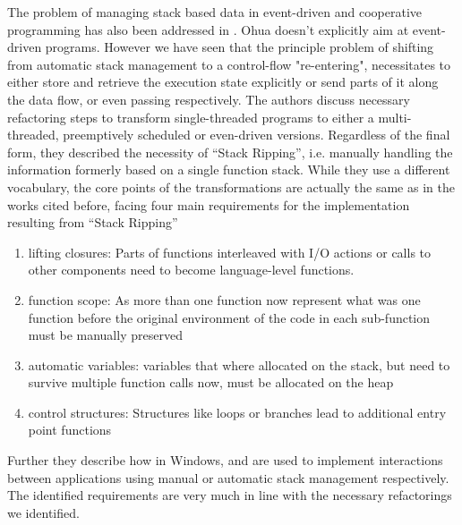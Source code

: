 The problem of managing stack based data in event-driven and cooperative programming has  also been addressed in \cite{adya2002cooperative}. Ohua doesn't explicitly aim at event-driven programs. However we have seen that the principle problem of shifting from automatic stack management to a control-flow "re-entering", necessitates to either store and retrieve the execution state explicitly or send parts of it along the data flow, or even passing respectively. The authors discuss necessary refactoring steps to transform single-threaded programs to either a multi-threaded, preemptively scheduled  or even-driven versions. Regardless of the final form, they described the necessity of ``Stack Ripping'', i.e. manually handling the information formerly based on a single function stack. While they use a different vocabulary, the core points of the transformations are actually the same as in the works cited before, facing four main requirements for the  implementation resulting from ``Stack Ripping''
\begin{enumerate}
    \item lifting closures: Parts of functions interleaved with I/O actions or calls to other components need to become language-level functions.
    \item function scope: As more than one function now represent what was one function before the original environment of the code in each sub-function must be manually preserved
    \item automatic variables: variables that where allocated on the stack, but need to survive multiple function calls now, must be allocated on the heap
    \item control structures: Structures like loops or branches lead to additional entry point functions
\end{enumerate}

 Further they describe how in Windows,  and  are used to implement interactions between applications using manual or automatic stack management respectively. The identified requirements are very much in line with the necessary refactorings we identified. 


